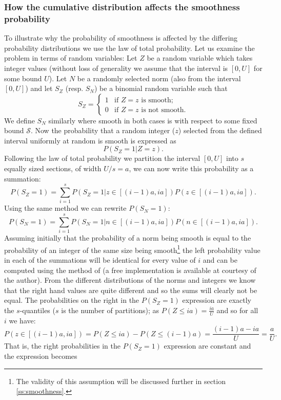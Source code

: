 \documentclass[a4paper, 10pt, envcountsect, runningheads]{article}
\numberwithin{figure}{section}
\numberwithin{equation}{section}
\begin{document}
\subsubsection*{How the cumulative distribution affects the smoothness probability}
To illustrate why the probability of smoothness is affected by the differing probability distributions we use the law of total probability. Let us examine the problem in terms of random variables: Let $Z$ be a random variable which takes integer values (without loss of generality we assume that the interval is $[0,U]$ for some bound $U$). Let $N$ be a randomly selected norm (also from the interval $[0,U]$) and let $S_Z$ (resp. $S_N$) be a binomial random variable such that 
\begin{equation}
S_Z=\left\{\begin{array}{ll}
1 & \mbox{if }Z=z\mbox{ is smooth};\\
0 & \mbox{if }Z=z\mbox{ is not smooth}.
\end{array}\right.
\end{equation}
We define $S_N$ similarly where smooth in both cases is with respect to some fixed bound $\mathcal{S}$. Now the probability that a random integer ($z$) selected from the defined interval uniformly at random is smooth is expressed as $$P(S_Z=1| Z=z).$$ Following the law of total probability we partition the interval $[0,U]$ into $s$ equally sized sections, of width $U/s=a$, we can now write this probability as a summation: $$P(S_Z=1)=\sum_{i=1}^{s}P(S_Z=1| z\in[(i-1)a,ia])P(z\in[(i-1)a,ia]).$$ Using the same method we can rewrite $P(S_N=1)$: $$P(S_N=1)=\sum_{i=1}^{s}P(S_N=1| n\in[(i-1)a,ia])P(n\in[(i-1)a,ia]).$$
Assuming initially that the probability of a norm being smooth is equal to the probability of an integer of the same size being smooth\footnote{The validity of this assumption will be discussed further in section \ref{ss:smoothness}.} the left probability value in each of the summations will be identical for every value of $i$ and can be computed using the method of \cite{dan_psi_est} (a free implementation is available at \cite{dan_imp} courtesy of the author). From the different distributions of the norms and integers we know that the right hand values are quite different and so the sums will clearly not be equal. 
The probabilities on the right in the $P(S_Z=1)$ expression are exactly the $s$-quantiles ($s$ is the number of partitions); as $P(Z\leq ia)=\frac{ia}{U}$ and so for all $i$ we have: $$P(z\in[(i-1)a,ia])=P(Z\leq ia)-P(Z\leq (i-1)a)=\frac{(i-1)a-ia}{U}=\frac{a}{U}.$$ That is, the right probabilities in the $P(S_Z=1)$ expression are constant and the expression becomes 
\end{document}
